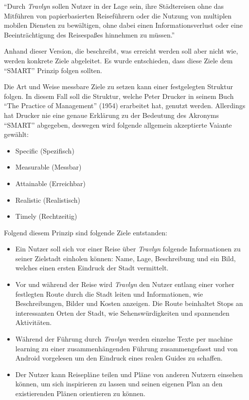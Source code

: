 \enquote{Durch \textit{Travlyn} sollen Nutzer in der Lage sein, ihre Städtereisen ohne das Mitführen von papierbasierten Reiseführern oder die Nutzung von multiplen mobilen Diensten zu bewältigen, ohne dabei einen Informationsverlust oder eine Beeinträchtigung des Reisespaßes hinnehmen zu müssen.}

\vspace{0.25cm}

Anhand dieser Version, die beschreibt, was erreicht werden soll aber nicht wie, werden konkrete Ziele abgeleitet. Es wurde entschieden, dass diese Ziele dem \enquote{SMART} Prinzip folgen sollten.

\begin{defStrich}
	Die Art und Weise messbare Ziele zu setzen kann einer festgelegten Struktur folgen. In diesem Fall soll die Struktur, welche Peter Drucker in seinem Buch \enquote{The Practice of Management} (1954) erarbeitet hat, genutzt werden. Allerdings hat Drucker nie eine genaue Erklärung zu der Bedeutung des Akronyms \enquote{SMART} abgegeben, deswegen wird folgende allgemein akzeptierte Vaiante gewählt\cite{Lawlor.2012}:
	\begin{itemize}
		\item Specific (Spezifisch)
		\item Measurable (Messbar)
		\item Attainable (Erreichbar)
		\item Realistic (Realistisch)
		\item Timely (Rechtzeitig)
	\end{itemize}   
\end{defStrich} 

Folgend diesem Prinzip sind folgende Ziele entstanden:

\begin{itemize}
	\item Ein Nutzer soll sich vor einer Reise über \textit{Travlyn} folgende Informationen zu seiner Zielstadt einholen können: Name, Lage, Beschreibung und ein Bild, welches einen ersten Eindruck der Stadt vermittelt.
	\item Vor und während der Reise wird \textit{Travlyn} den Nutzer entlang einer vorher festlegten Route durch die Stadt leiten und Informationen, wie Beschreibungen, Bilder und Kosten anzeigen. Die Route beinhaltet Stops an interessanten Orten der Stadt, wie Sehenswürdigkeiten und spannenden Aktivitäten.
	\item Während der Führung durch \textit{Travlyn} werden einzelne Texte per machine learning zu einer zusammenhängenden Führung zusammengefasst und von Android vorgelesen um den Eindruck eines realen Guides zu schaffen.
	\item Der Nutzer kann Reisepläne teilen und Pläne von anderen Nutzern einsehen können, um sich inspirieren zu lassen und seinen eigenen Plan an den existierenden Plänen orientieren zu können. 
\end{itemize}

